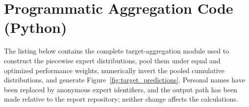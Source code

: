 \chapter{Programmatic Aggregation Code (Python)}
\label{appendix:programmatic_code}

The listing below contains the complete target-aggregation module used to construct the piecewise expert distributions, pool them under equal and optimized performance weights, numerically invert the pooled cumulative distributions, and generate Figure~\ref{fig:target_predictions}. Personal names have been replaced by anonymous expert identifiers, and the output path has been made relative to the report repository; neither change affects the calculations.



